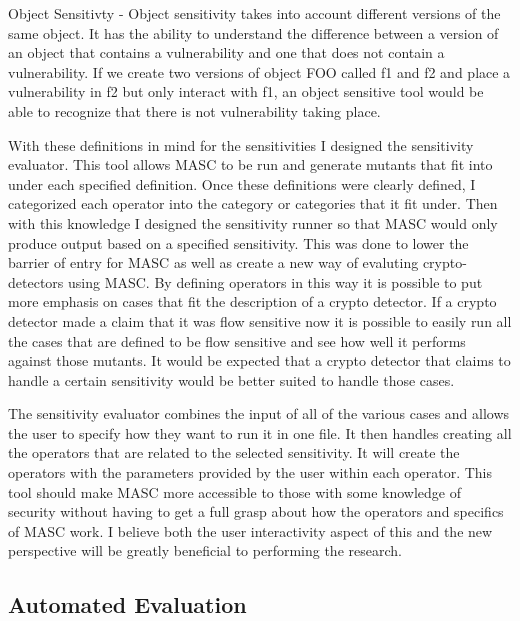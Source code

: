 Object Sensitivty - Object sensitivity takes into account different versions of the same object. It has the ability to understand the difference between a version of an object that contains a vulnerability and one that does not contain a vulnerability. If we create two versions of object FOO called f1 and f2 and place a vulnerability in f2 but only interact with f1, an object sensitive tool would be able to recognize that there is not vulnerability taking place.

With these definitions in mind for the sensitivities I designed the sensitivity evaluator. This tool allows MASC to be run and generate mutants that fit into under each specified definition. Once these definitions were clearly defined, I categorized each operator into the category or categories that it fit under. Then with this knowledge I designed the sensitivity runner so that MASC would only produce output based on a specified sensitivity. This was done to lower the barrier of entry for MASC as well as create a new way of evaluting crypto-detectors using MASC. By defining operators in this way it is possible to put more emphasis on cases that fit the description of a crypto detector. If a crypto detector made a claim that it was flow sensitive now it is possible to easily run all the cases that are defined to be flow sensitive and see how well it performs against those mutants. It would be expected that a crypto detector that claims to handle a certain sensitivity would be better suited to handle those cases. 

The sensitivity evaluator combines the input of all of the various cases and allows the user to specify how they want to run it in one file. It then handles creating all the operators that are related to the selected sensitivity. It will create the operators with the parameters provided by the user within each operator. This tool should make MASC more accessible to those with some knowledge of security without having to get a full grasp about how the operators and specifics of MASC work. I believe both the user interactivity aspect of this and the new perspective will be greatly beneficial to performing the research.


\subsection{Automated Evaluation}
\label{ch3:subsec:automation}

